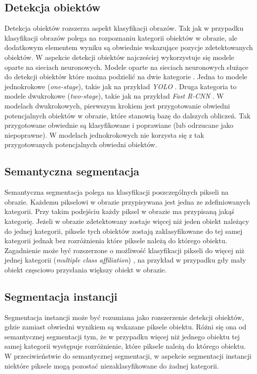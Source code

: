 \subsection*{Detekcja obiektów}
Detekcja obiektów rozszerza aspekt klasyfikacji obrazów. Tak jak w przypadku klasyfikacji obrazów polega na rozpoznaniu kategorii obiektów w obrazie, ale dodatkowym elementem wyniku są obwiednie wskazujące pozycje zdetektowanych obiektów. W aspekcie detekcji obiektów najcześciej wykorzystuje się modele oparte na sieciach neuronowych. Modele oparte na sieciach neuronowych służące do detekcji obiektów które można podzielić na dwie kategorie \cite{survey-deep-learning-object-dection}. Jedna to modele jednokrokowe (\textit{one-stage}), takie jak na przykład \textit{YOLO} \cite{yolo}. Druga kategoria to modele dwukrokowe (\textit{two-stage}), takie jak na przykład \textit{Fast R-CNN} \cite{fast-rcnn}. W modelach dwukrokowych, pierwszym krokiem jest przygotowanie obwiedni potencjalnych obiektów w obrazie, które stanowią bazę do dalszych obliczeń. Tak przygotowane obwiednie są klasyfikowane i poprawiane (lub odrzucane jako niepoprawne). W modelach jednokrokowych nie korzysta się z tak przygotowanych potencjalnych obwiedni obiektów.

\subsection*{Semantyczna segmentacja}
Semantyczna segmentacja polega na klasyfikacji poszczególnych pikseli na obrazie. Każdemu pikselowi w obrazie przypisywana jest jedna ze zdefiniowanych kategorii. Przy takim podejściu każdy piksel w obrazie ma przypisaną jakąś kategorię. Jeżeli w obrazie zdetektowany zostaje więcej niż jeden obiekt należący do jednej kategorii, piksele tych obiektów zostają zaklasyfikowane do tej samej kategorii jednak bez rozróżnienia które piksele należą do którego obiektu.
Zagadnienie może być rozszerzone o możliwość klasyfikacji pikseli do więcej niż jednej kategorii (\textit{multiple class affiliation}) \cite{survey-semantic-segmentation}, na przykład w przypadku gdy mały obiekt częsciowo przysłania większy obiekt w obrazie.

\subsection*{Segmentacja instancji}
Segmentacja instancji może być rozumiana jako rozszerzenie detekcji obiektów, gdzie zamiast obwiedni wynikiem są wskazane piksele obiektu. Różni się ona od semantycznej segmentacji tym, że w przypadku więcej niż jednego obiektu tej samej kategorii występuje rozróżnienie, które piksele należą do którego obiektu. W przeciwieństwie do semantycznej segmentacji, w aspekcie segmentacji instancji niektóre piksele mogą pozostać niezaklasyfikowane do żadnej kategorii.

